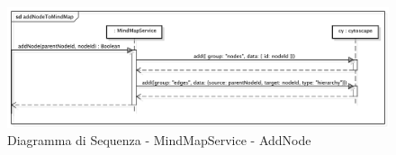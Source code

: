 {}
{}
\begin{center}
\begin{figure}[h]
\centering
\includegraphics[scale=0.33,keepaspectratio]{diagrammi/sequenza/FrontEnd/services/addNodeToMindMap.pdf}
\caption{Diagramma di Sequenza - MindMapService - AddNode}
\end{figure}
\end{center}
\FloatBarrier
